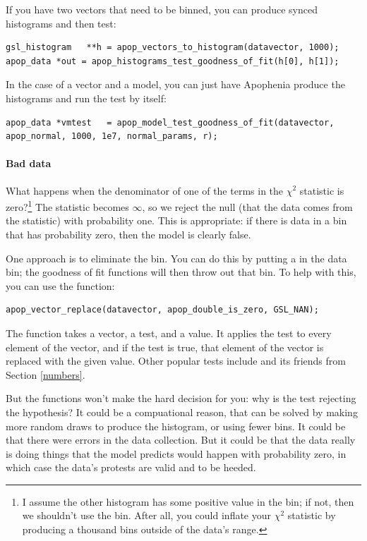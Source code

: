 If you have two vectors that need to be binned, you can produce 
synced histograms and then test:
\begin{lstlisting}
gsl_histogram   **h = apop_vectors_to_histogram(datavector, 1000);
apop_data *out = apop_histograms_test_goodness_of_fit(h[0], h[1]);
\end{lstlisting}
In the case of a vector and a model, you can just have
Apophenia produce the histograms and run the test by itself:
\begin{lstlisting}
apop_data *vmtest   = apop_model_test_goodness_of_fit(datavector, apop_normal, 1000, 1e7, normal_params, r);
\end{lstlisting}

\paragraph{\treesymbol Bad data} What happens when the denominator of
one of the terms in the $\chi^2$ statistic is zero?\footnote{I assume
the other histogram has some positive value in the bin; if not, then
we shouldn't use the bin. After all, you could inflate your $\chi^2$
statistic by producing a thousand bins outside of the data's range.} The
statistic becomes $\infty$, so we reject the null (that the data comes
from the statistic) with probability one. This is appropriate: if there is
data in a bin that has probability zero, then the model is clearly false.

One approach is to eliminate the bin. You can do this by putting a
 in the data bin; the goodness of fit functions will
then throw out that bin. To help with this, you can use the
 function:
\begin{lstlisting}
apop_vector_replace(datavector, apop_double_is_zero, GSL_NAN);
\end{lstlisting}
The function takes a vector, a test, and a  value. It
applies the test to every element of the vector, and if the test is
true, that element of the vector is replaced with the given value. Other
popular tests include  and its friends from Section
\ref{numbers}.

But the functions won't make the hard decision for you: why is the test
rejecting the hypothesis? It could be a compuational reason, that can be solved by  making more random draws to produce the histogram, or using fewer bins.
It could be that there were errors in the  data collection.
But it could be that the data really is doing things that the model
predicts would happen with probability zero, in which case the data's
protests are valid and to be heeded.
